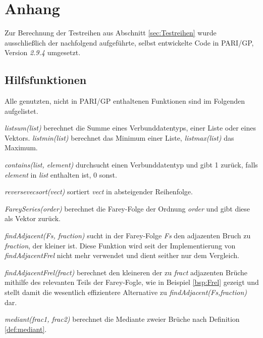 \section{Anhang}\label{sec:code}

Zur Berechnung der Testreihen aus Abschnitt \ref{sec:Testreihen} wurde ausschließlich der nachfolgend aufgeführte, selbst entwickelte Code in PARI/GP, Version \emph{2.9.4} umgesetzt.

\subsection{Hilfsfunktionen}
Alle genutzten, nicht in PARI/GP enthaltenen Funktionen sind im Folgenden aufgelistet.

\emph{listsum(list)} berechnet die Summe eines Verbunddatentyps, \bspw einer Liste oder eines Vektors. \emph{listmin(list)} berechnet das Minimum einer Liste, \emph{listmax(list)} das Maximum.


\emph{contains(list, element)} durchsucht einen Verbunddatentyp und gibt 1 zurück, falls \emph{element} in \emph{list} enthalten ist, 0 sonst.


\emph{reversevecsort(vect)} sortiert \emph{vect} in absteigender Reihenfolge.


\emph{FareySeries(order)} berechnet die Farey-Folge der Ordnung \emph{order} und gibt diese als Vektor zurück.


\emph{findAdjacent(Fs, fraction)} sucht in der Farey-Folge \emph{Fs} den adjazenten Bruch zu \emph{fraction}, der kleiner ist. Diese Funktion wird seit der Implementierung von \emph{findAdjacentFrel} nicht mehr verwendet und dient seither nur dem Vergleich.


\emph{findAdjacentFrel(fract)} berechnet den kleineren der zu \emph{fract} adjazenten Brüche mithilfe des relevanten Teils der Farey-Fogle, wie in Beispiel \ref{bsp:Frel} gezeigt und stellt damit die wesentlich effizientere Alternative zu \emph{findAdjacent(Fs,fraction)} dar.


\emph{mediant(frac1, frac2)} berechnet die Mediante zweier Brüche nach Definition \ref{def:mediant}.


